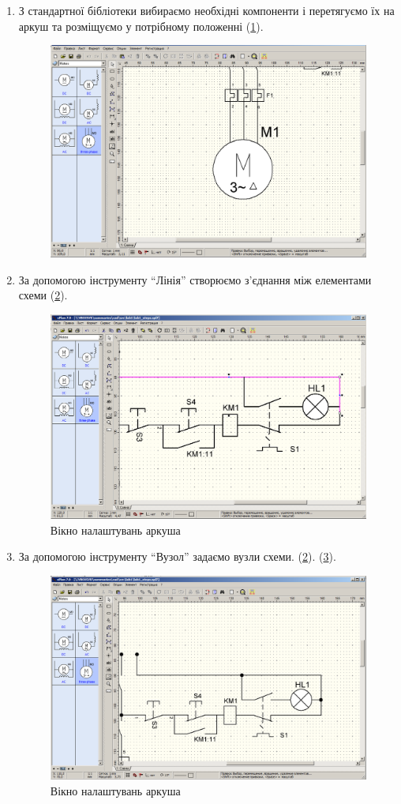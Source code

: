 \begin{enumerate}[leftmargin=*]
\item З стандартної бібліотеки вибираємо необхідні компоненти і перетягуємо їх на аркуш та
  розміщуємо у потрібному положенні (\ref{fig:lab1:step1}).
  \begin{figure}[!ht]
    \centering \includegraphics[width=0.7\linewidth]{./images/lab1/step1.png}
    \caption{\label{fig:lab1:step1} }
  \end{figure}
  \FloatBarrier

\item За допомогою інструменту ``Лінія'' створюємо з’єднання між елементами схеми
  (\ref{fig:lab1:step2}).
  \begin{figure}[!ht]
    \centering \includegraphics[width=0.7\linewidth]{./images/lab1/step2.png}
    \caption{Вікно налаштувань аркуша}
    \label{fig:lab1:step2} 
  \end{figure}
  \FloatBarrier

\item За допомогою інструменту ``Вузол'' задаємо вузли схеми.
  (\ref{fig:lab1:step2}). (\ref{fig:lab1:step3}).
  \begin{figure}[!ht]
    \centering \includegraphics[width=0.7\linewidth]{./images/lab1/step3.png}
    \caption{Вікно налаштувань аркуша}
    \label{fig:lab1:step3} 
  \end{figure}
  \FloatBarrier


\end{enumerate}
